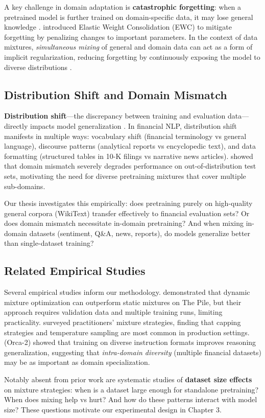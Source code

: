 A key challenge in domain adaptation is \textbf{catastrophic forgetting}: when a pretrained model is further trained on domain-specific data, it may lose general knowledge \parencite{mccloskey1989catastrophic, french1999catastrophic}. \textcite{kirkpatrick2017overcoming} introduced Elastic Weight Consolidation (EWC) to mitigate forgetting by penalizing changes to important parameters. In the context of data mixtures, \textit{simultaneous mixing} of general and domain data can act as a form of implicit regularization, reducing forgetting by continuously exposing the model to diverse distributions \parencite{arivazhagan2019massively,raffel2020exploring}.

\subsection{Distribution Shift and Domain Mismatch}

\textbf{Distribution shift}---the discrepancy between training and evaluation data---directly impacts model generalization \parencite{quinonero2009dataset}. In financial NLP, distribution shift manifests in multiple ways: vocabulary shift (financial terminology vs general language), discourse patterns (analytical reports vs encyclopedic text), and data formatting (structured tables in 10-K filings vs narrative news articles). \textcite{aharoni2020unsupervised} showed that domain mismatch severely degrades performance on out-of-distribution test sets, motivating the need for diverse pretraining mixtures that cover multiple sub-domains.

Our thesis investigates this empirically: does pretraining purely on high-quality general corpora (WikiText) transfer effectively to financial evaluation sets? Or does domain mismatch necessitate in-domain pretraining? And when mixing in-domain datasets (sentiment, Q\&A, news, reports), do models generalize better than single-dataset training?

\subsection{Related Empirical Studies}

Several empirical studies inform our methodology. \textcite{xie2023doremi} demonstrated that dynamic mixture optimization can outperform static mixtures on The Pile, but their approach requires validation data and multiple training runs, limiting practicality. \textcite{longpre2023pretrainer} surveyed practitioners' mixture strategies, finding that capping strategies and temperature sampling are most common in production settings. \textcite{mitra2023orca2} (Orca-2) showed that training on diverse instruction formats improves reasoning generalization, suggesting that \textit{intra-domain diversity} (multiple financial datasets) may be as important as domain specialization.

Notably absent from prior work are systematic studies of \textbf{dataset size effects} on mixture strategies: when is a dataset large enough for standalone pretraining? When does mixing help vs hurt? And how do these patterns interact with model size? These questions motivate our experimental design in Chapter 3.
